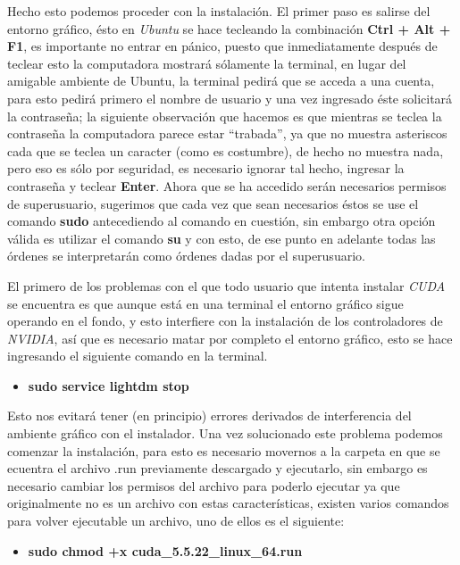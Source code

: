 \documentclass{article}
\begin{document}
Hecho esto podemos proceder con la instalación. El primer paso es
salirse del entorno gráfico, ésto en \emph{Ubuntu} se hace tecleando la
combinación \textbf{Ctrl + Alt + F1}, es importante no entrar en pánico,
puesto que inmediatamente después de teclear esto la computadora
mostrará sólamente la terminal, en lugar del amigable ambiente de
Ubuntu, la terminal pedirá que se acceda a una cuenta, para esto pedirá
primero el nombre de usuario y una vez ingresado éste solicitará la
contraseña; la siguiente observación que hacemos es que mientras se
teclea la contraseña la computadora parece estar ``trabada'', ya que no
muestra asteriscos cada que se teclea un caracter (como es costumbre),
de hecho no muestra nada, pero eso es sólo por seguridad, es necesario
ignorar tal hecho, ingresar la contraseña y teclear \textbf{Enter}.
Ahora que se ha accedido serán necesarios permisos de superusuario,
sugerimos que cada vez que sean necesarios éstos se use el comando
\textbf{sudo} antecediendo al comando en cuestión, sin embargo otra
opción válida es utilizar el comando \textbf{su} y con esto, de ese
punto en adelante todas las órdenes se interpretarán como órdenes dadas
por el superusuario.

El primero de los problemas con el que todo usuario que intenta instalar
\emph{CUDA} se encuentra es que aunque está en una terminal el entorno
gráfico sigue operando en el fondo, y esto interfiere con la instalación
de los controladores de \emph{NVIDIA}, así que es necesario matar por
completo el entorno gráfico, esto se hace ingresando el siguiente
comando en la terminal.

\begin{itemize}
\itemsep1pt\parskip0pt
\item
  \textbf{sudo service lightdm stop}
\end{itemize}

Esto nos evitará tener (en principio) errores derivados de interferencia
del ambiente gráfico con el instalador. Una vez solucionado este
problema podemos comenzar la instalación, para esto es necesario
movernos a la carpeta en que se ecuentra el archivo .run previamente
descargado y ejecutarlo, sin embargo es necesario cambiar los permisos
del archivo para poderlo ejecutar ya que originalmente no es un archivo
con estas características, existen varios comandos para volver
ejecutable un archivo, uno de ellos es el siguiente:

\begin{itemize}
\itemsep1pt\parskip0pt
\item
  \textbf{sudo chmod +x cuda\_5.5.22\_linux\_64.run}
\end{itemize}
\end{document}
